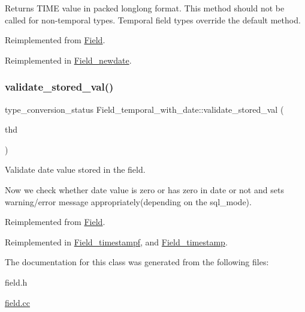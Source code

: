 Returns T\+I\+ME value in packed longlong format. This method should not be called for non-\/temporal types. Temporal field types override the default method. 

Reimplemented from \mbox{\hyperlink{classField_a504ae8be08face4684852eaa79734158}{Field}}.



Reimplemented in \mbox{\hyperlink{classField__newdate_aad085aaff8fef3367986f9733b79605c}{Field\+\_\+newdate}}.

\mbox{\label{classField__temporal__with__date_af9ebe4d96a6a81232e4a41e4b1d7b599}} 
\subsubsection{\texorpdfstring{validate\+\_\+stored\+\_\+val()}{validate\_stored\_val()}}
{\footnotesize\ttfamily type\+\_\+conversion\+\_\+status Field\+\_\+temporal\+\_\+with\+\_\+date\+::validate\+\_\+stored\+\_\+val (\begin{DoxyParamCaption}\item[{T\+HD $\ast$}]{thd }\end{DoxyParamCaption})\hspace{0.3cm}{\ttfamily [virtual]}}

Validate date value stored in the field.

Now we check whether date value is zero or has zero in date or not and sets warning/error message appropriately(depending on the sql\+\_\+mode). 

Reimplemented from \mbox{\hyperlink{classField}{Field}}.



Reimplemented in \mbox{\hyperlink{classField__timestampf_a3a96ed01920259945daf2744367a94f1}{Field\+\_\+timestampf}}, and \mbox{\hyperlink{classField__timestamp_ac6253aa19d757ba5607be97fbbefe02a}{Field\+\_\+timestamp}}.



The documentation for this class was generated from the following files\+:\begin{DoxyCompactItemize}
\item 
field.\+h\item 
\mbox{\hyperlink{field_8cc}{field.\+cc}}\end{DoxyCompactItemize}
